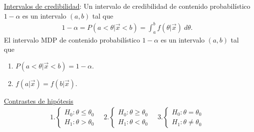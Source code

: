 \underline{Intervalos de credibilidad}: Un intervalo de credibilidad de contenido probabilístico $1-\alpha$ es un intervalo $(a,b)$ tal que
\begin{align*}
    1 - \alpha = P(a < \theta | \vec{x} < b) = \int_{a}^{b} f(\theta | \vec{x}) \ d\theta.
\end{align*}
El intervalo MDP de contenido probabilístico $1-\alpha$ es un intervalo $(a,b)$ tal que
\begin{enumerate}
    \item $P(a < \theta | \vec{x} < b) = 1 - \alpha$.
    \item $f(a | \vec{x}) = f(b | \vec{x})$.
\end{enumerate}
\underline{Contrastes de hipótesis}
\begin{align*}
    1. \begin{cases}
           H_0 : \theta \leq \theta_0 \\
           H_1 : \theta > \theta_0
       \end{cases} \quad     2.\begin{cases}
                                   H_0 : \theta \ge \theta_0 \\
                                   H_1 : \theta < \theta_0
                               \end{cases} \quad     3.\begin{cases}
                                                           H_0 : \theta = \theta_0 \\
                                                           H_1 : \theta \not = \theta_0
                                                       \end{cases}
\end{align*}

